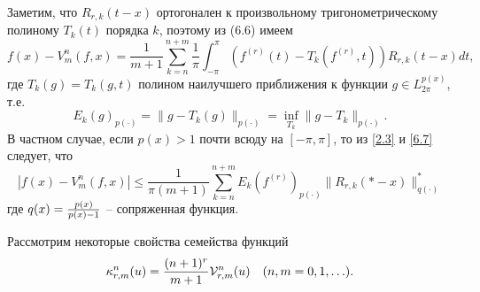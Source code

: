 Заметим, что $R_{r,k}(t-x)$ ортогонален к произвольному тригонометрическому полиному $T_k(t)$
порядка $k$, поэтому из (6.6) имеем
\begin{equation}\label{6.7}
  f(x)-V_m^n(f,x)= \frac{1}{m+1}\sum_{k=n}^{n+m}\frac{1}{\pi}\int_{-\pi}^\pi (f^{(r)}(t)-T_k(f^{(r)},t))R_{r,k}(t-x)dt,
 \end{equation}
где $T_k(g)=T_k(g,t)$ полином наилучшего приближения к функции  $g\in L_{2\pi}^{p(x)}$, т.е.
\begin{equation}\label{6.8}
    E_k(g)_{p(\cdot)}=\|g-T_k(g)\|_{p(\cdot)}=\inf_{T_k}\|g-T_k\|_{p(\cdot)}.
\end{equation}
В частном случае, если $p(x)>1$ почти всюду на $[-\pi,\pi]$, то из \eqref{2.3} и \eqref{6.7} следует, что
\begin{equation}\label{6.9}
    |f(x)-V_m^n(f,x)|\le \frac{1}{\pi(m+1)}\sum_{k=n}^{n+m}E_k(f^{(r)})_{p(\cdot)}\|R_{r,k}(*-x)\|_{q(\cdot)}^*
\end{equation}
где $q(x)={p(x)\over p(x)-1}$ -- сопряженная функция.

Рассмотрим некоторые свойства семейства функций
\begin{equation}\label{6.10}
    \kappa_{r,m}^n(u)=\frac{(n+1)^r}{m+1}{\cal V}_{r,m}^n(u) \quad (n,m=0,1,\ldots).
\end{equation}

